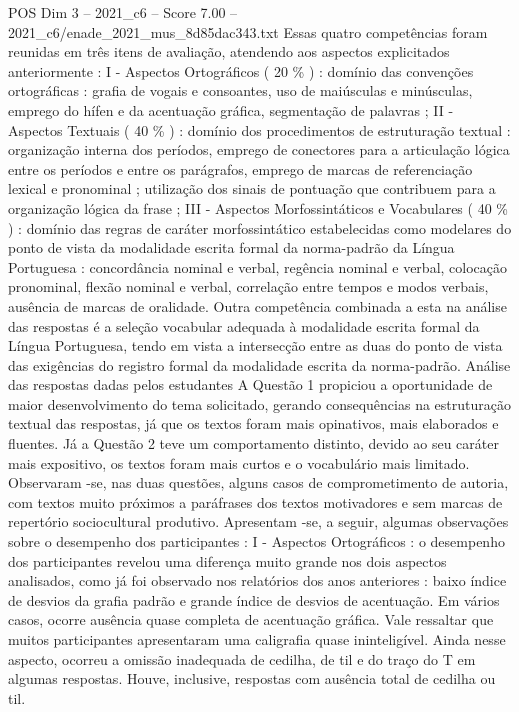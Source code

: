 \begin{textsample}{POS Dim 3 – 2021\_c6 – Score 7.00 – 2021\_c6/enade\_2021\_mus\_8d85dac343.txt}
Essas quatro competências foram reunidas em três itens de avaliação, atendendo aos aspectos explicitados anteriormente : I - Aspectos Ortográficos ( 20 \% ) : domínio das convenções ortográficas : grafia de vogais e consoantes, uso de maiúsculas e minúsculas, emprego do hífen e da acentuação gráfica, segmentação de palavras ; II - Aspectos Textuais ( 40 \% ) : domínio dos procedimentos de estruturação textual : organização interna dos períodos, emprego de conectores para a articulação lógica entre os períodos e entre os parágrafos, emprego de marcas de referenciação lexical e pronominal ; utilização dos sinais de pontuação que contribuem para a organização lógica da frase ; III - Aspectos Morfossintáticos e Vocabulares ( 40 \% ) : domínio das regras de caráter morfossintático estabelecidas como modelares do ponto de vista da modalidade escrita formal da norma-padrão da Língua Portuguesa : concordância nominal e verbal, regência nominal e verbal, colocação pronominal, flexão nominal e verbal, correlação entre tempos e modos verbais, ausência de marcas de oralidade.
Outra competência combinada a esta na análise das respostas é a seleção vocabular adequada à modalidade escrita formal da Língua Portuguesa, tendo em vista a intersecção entre as duas do ponto de vista das exigências do registro formal da modalidade escrita da norma-padrão.
Análise das respostas dadas pelos estudantes A Questão 1 propiciou a oportunidade de maior desenvolvimento do tema solicitado, gerando consequências na estruturação textual das respostas, já que os textos foram mais opinativos, mais elaborados e fluentes.
Já a Questão 2 teve um comportamento distinto, devido ao seu caráter mais expositivo, os textos foram mais curtos e o vocabulário mais limitado.
Observaram -se, nas duas questões, alguns casos de comprometimento de autoria, com textos muito próximos a paráfrases dos textos motivadores e sem marcas de repertório sociocultural produtivo.
Apresentam -se, a seguir, algumas observações sobre o desempenho dos participantes : I - Aspectos Ortográficos : o desempenho dos participantes revelou uma diferença muito grande nos dois aspectos analisados, como já foi observado nos relatórios dos anos anteriores : baixo índice de desvios da grafia padrão e grande índice de desvios de acentuação.
Em vários casos, ocorre ausência quase completa de acentuação gráfica.
Vale ressaltar que muitos participantes apresentaram uma caligrafia quase ininteligível.
Ainda nesse aspecto, ocorreu a omissão inadequada de cedilha, de til e do traço do T em algumas respostas.
Houve, inclusive, respostas com ausência total de cedilha ou til.

\end{textsample}
